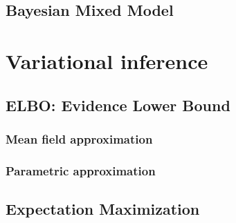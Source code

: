 \documentclass[a4paper,10pt]{book}
\begin{document}
    
    
    \section{Bayesian Mixed Model}
    
    
        
\chapter{Variational inference}

\section{ELBO: Evidence Lower Bound}



\subsection{Mean field approximation}



\subsection{Parametric approximation}



\section{Expectation Maximization}


\end{document}
